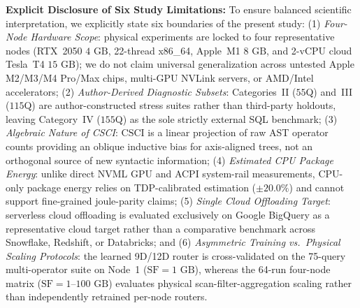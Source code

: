 \documentclass[10pt,a4paper]{article}
\begin{document}
\noindent\textbf{Explicit Disclosure of Six Study Limitations:} To ensure balanced scientific interpretation, we explicitly state six boundaries of the present study:
(1) \emph{Four-Node Hardware Scope}: physical experiments are locked to four representative nodes (RTX~2050 $4\text{ GB}$, 22-thread x86\_64, Apple~M1 $8\text{ GB}$, and 2-vCPU cloud Tesla~T4 $15\text{ GB}$); we do not claim universal generalization across untested Apple M2/M3/M4 Pro/Max chips, multi-GPU NVLink servers, or AMD/Intel accelerators;
(2) \emph{Author-Derived Diagnostic Subsets}: Categories~II ($55$Q) and~III ($115$Q) are author-constructed stress suites rather than third-party holdouts, leaving Category~IV ($155$Q) as the sole strictly external SQL benchmark;
(3) \emph{Algebraic Nature of CSCI}: $\text{CSCI}$ is a linear projection of raw AST operator counts providing an oblique inductive bias for axis-aligned trees, not an orthogonal source of new syntactic information;
(4) \emph{Estimated CPU Package Energy}: unlike direct NVML GPU and ACPI system-rail measurements, CPU-only package energy relies on TDP-calibrated estimation ($\pm 20.0\%$) and cannot support fine-grained joule-parity claims;
(5) \emph{Single Cloud Offloading Target}: serverless cloud offloading is evaluated exclusively on Google BigQuery as a representative cloud target rather than a comparative benchmark across Snowflake, Redshift, or Databricks; and
(6) \emph{Asymmetric Training vs.\ Physical Scaling Protocols}: the learned 9D/12D router is cross-validated on the 75-query multi-operator suite on Node~1 ($\text{SF}=1\text{ GB}$), whereas the 64-run four-node matrix ($\text{SF}=1\text{--}100\text{ GB}$) evaluates physical scan-filter-aggregation scaling rather than independently retrained per-node routers.
\end{document}
